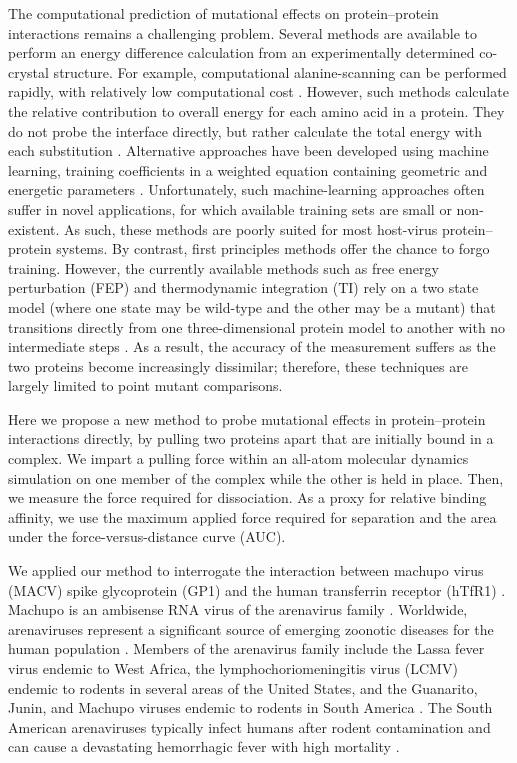 \documentclass[12pt]{article}
\begin{document}
The computational prediction of mutational effects on protein--protein interactions remains a challenging problem. Several methods are available to perform an energy difference calculation from an experimentally determined co-crystal structure. For example, computational alanine-scanning can be performed rapidly, with relatively low computational cost \citep{Grant2011,Kortemme2004}. However, such methods calculate the relative contribution to overall energy for each amino acid in a protein. They do not probe the interface directly, but rather calculate the total energy with each substitution \citep{Grant2011,Kortemme2004}. Alternative approaches have been developed using machine learning, training coefficients in a weighted equation containing geometric and energetic parameters \citep{Vreven2011,Vreven2012,Bajaj2011,Hwang2010}. Unfortunately, such machine-learning approaches often suffer in novel applications, for which available training sets are small or non-existent. As such, these methods are poorly suited for most host-virus protein--protein systems. By contrast, first principles methods offer the chance to forgo training. However, the currently available methods such as free energy perturbation (FEP) and thermodynamic integration (TI) rely on a two state model (where one state may be wild-type and the other may be a mutant) that transitions directly from one three-dimensional protein model to another with no intermediate steps \citep{Gilson1997,Lu2004}. As a result, the accuracy of the measurement suffers as the two proteins become increasingly dissimilar; therefore, these techniques are largely limited to point mutant comparisons.

Here we propose a new method to probe mutational effects in protein--protein interactions directly, by pulling two proteins apart that are initially bound in a complex. We impart a pulling force within an all-atom molecular dynamics simulation on one member of the complex while the other is held in place. Then, we measure the force required for dissociation. As a proxy for relative binding affinity, we use the maximum applied force required for separation and the area under the force-versus-distance curve (AUC). 

We applied our method to interrogate the interaction between machupo virus (MACV) spike glycoprotein (GP1) and the human transferrin receptor (hTfR1) \citep{Abraham2010,Charrel2003}. Machupo is an ambisense RNA virus of the arenavirus family \citep{Charrel2003}. Worldwide, arenaviruses represent a significant source of emerging zoonotic diseases for the human population \citep{Charrel2003}. Members of the arenavirus family include the Lassa fever virus endemic to West Africa, the lymphochoriomeningitis virus (LCMV) endemic to rodents in several areas of the United States, and the Guanarito, Junin, and Machupo viruses endemic to rodents in South America \citep{Charrel2003}. The South American arenaviruses typically infect humans after rodent contamination and can cause a devastating hemorrhagic fever with high mortality \citep{Charrel2003}.
\end{document}
